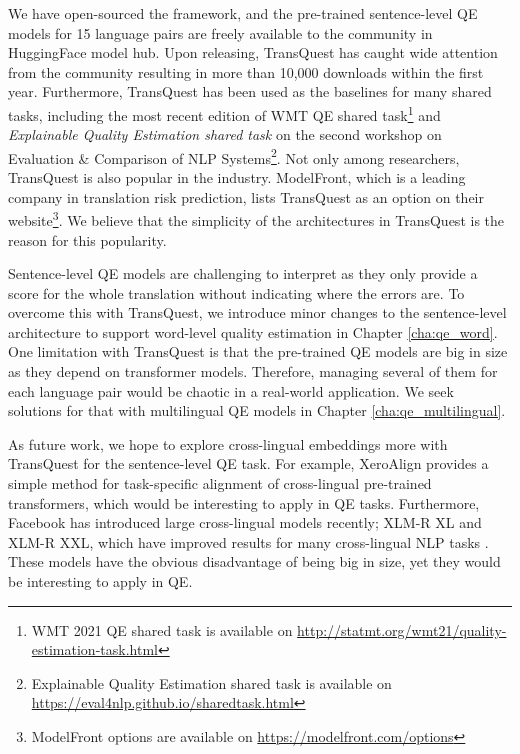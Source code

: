 We have open-sourced the framework, and the pre-trained sentence-level QE models for 15 language pairs are freely available to the community in HuggingFace model hub. Upon releasing, TransQuest has caught wide attention from the community resulting in more than 10,000 downloads within the first year. Furthermore, TransQuest has been used as the baselines for many shared tasks, including the most recent edition of WMT QE shared task\footnote{WMT 2021 QE shared task is available on \url{http://statmt.org/wmt21/quality-estimation-task.html}} and \textit{Explainable Quality Estimation shared task} on the second workshop on Evaluation \& Comparison of NLP Systems\footnote{Explainable Quality Estimation shared task is available on \url{https://eval4nlp.github.io/sharedtask.html}}. Not only among researchers, TransQuest is also popular in the industry. ModelFront, which is a leading company in translation risk prediction, lists TransQuest as an option on their website\footnote{ModelFront options are available on \url{https://modelfront.com/options}}. We believe that the simplicity of the architectures in TransQuest is the reason for this popularity. 

Sentence-level QE models are challenging to interpret as they only provide a score for the whole translation without indicating where the errors are. To overcome this with TransQuest, we introduce minor changes to the sentence-level architecture to support word-level quality estimation in Chapter \ref{cha:qe_word}. One limitation with TransQuest is that the pre-trained QE models are big in size as they depend on transformer models. Therefore, managing several of them for each language pair would be chaotic in a real-world application. We seek solutions for that with multilingual QE models in Chapter \ref{cha:qe_multilingual}.

As future work, we hope to explore cross-lingual embeddings more with TransQuest for the sentence-level QE task. For example, XeroAlign \autocite{gritta-iacobacci-2021-xeroalign} provides a simple method for task-specific alignment of cross-lingual pre-trained transformers, which would be interesting to apply in QE tasks. Furthermore, Facebook has introduced large cross-lingual models recently; XLM-R XL and XLM-R XXL, which have improved results for many cross-lingual NLP tasks \autocite{goyal2021}. These models have the obvious disadvantage of being big in size, yet they would be interesting to apply in QE. 









